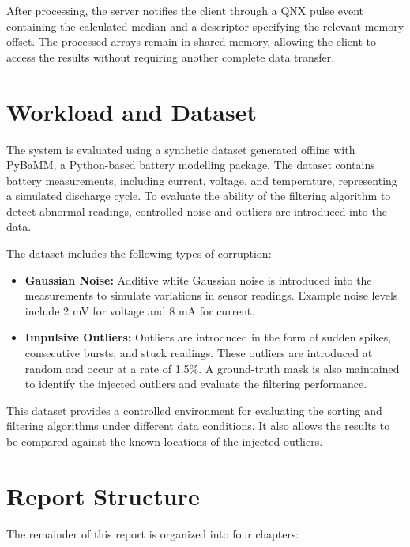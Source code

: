 \documentclass[12pt,a4paper,oneside]{report}
\begin{document}
After processing, the server notifies the client through a QNX pulse event containing the calculated median and a descriptor specifying the relevant memory offset. The processed arrays remain in shared memory, allowing the client to access the results without requiring another complete data transfer.

\section{Workload and Dataset}

The system is evaluated using a synthetic dataset generated offline with PyBaMM, a Python-based battery modelling package. The dataset contains battery measurements, including current, voltage, and temperature, representing a simulated discharge cycle. To evaluate the ability of the filtering algorithm to detect abnormal readings, controlled noise and outliers are introduced into the data.

The dataset includes the following types of corruption:

\begin{itemize}
    \item \textbf{Gaussian Noise:} Additive white Gaussian noise is introduced into the measurements to simulate variations in sensor readings. Example noise levels include 2 mV for voltage and 8 mA for current.

    \item \textbf{Impulsive Outliers:} Outliers are introduced in the form of sudden spikes, consecutive bursts, and stuck readings. These outliers are introduced at random and occur at a rate of 1.5\%. A ground-truth mask is also maintained to identify the injected outliers and evaluate the filtering performance.
\end{itemize}

This dataset provides a controlled environment for evaluating the sorting and filtering algorithms under different data conditions. It also allows the results to be compared against the known locations of the injected outliers.

\newpage

\section{Report Structure}

The remainder of this report is organized into four chapters:
\end{document}
